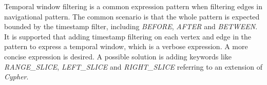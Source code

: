 
Temporal window filtering is a common expression pattern when filtering edges in
navigational pattern. The common scenario is that the whole pattern is expected
bounded by the timestamp filter, including \emph{BEFORE}, \emph{AFTER} and
\emph{BETWEEN}. It is supported that adding timestamp filtering on each vertex
and edge in the pattern to express a temporal window, which is a verbose
expression. A more concise expression is desired. A possible solution is adding
keywords like \emph{RANGE\_SLICE}, \emph{LEFT\_SLICE} and \emph{RIGHT\_SLICE}
referring to an extension of \emph{Cypher}\cite{tcypher}.


